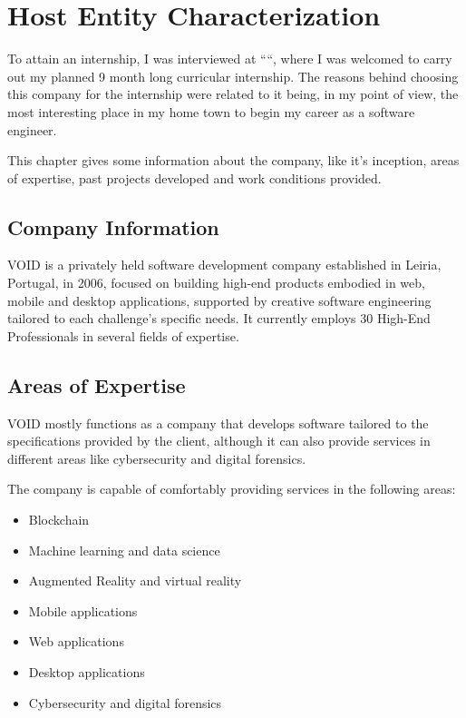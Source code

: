 


\chapter{Host Entity Characterization}
\label{ch:background}

To attain an internship, I was interviewed at ``\company``, where I was welcomed to carry out my planned 9 month long curricular internship.
The reasons behind choosing this company for the internship were related to it being, in my point of view, the most interesting place in my home town 
to begin my career as a software engineer.

This chapter gives some information about the company, like it's inception, areas of expertise, past projects developed and work conditions provided.

\section{Company Information}

VOID is a privately held software development company established in Leiria, Portugal, in 2006, focused on building high-end products embodied in web, 
mobile and desktop applications, supported by creative software engineering tailored to each challenge's specific needs. 
It currently employs 30 High-End Professionals in several fields of expertise.

\section{Areas of Expertise}

VOID mostly functions as a company that develops software tailored to the specifications provided by the client, although 
it can also provide services in different areas like cybersecurity and digital forensics.

The company is capable of comfortably providing services in the following areas:
\begin{itemize}
 \item Blockchain
 \item Machine learning and data science
 \item Augmented Reality and virtual reality
 \item Mobile applications
 \item Web applications
 \item Desktop applications
 \item Cybersecurity and digital forensics
\end{itemize}

